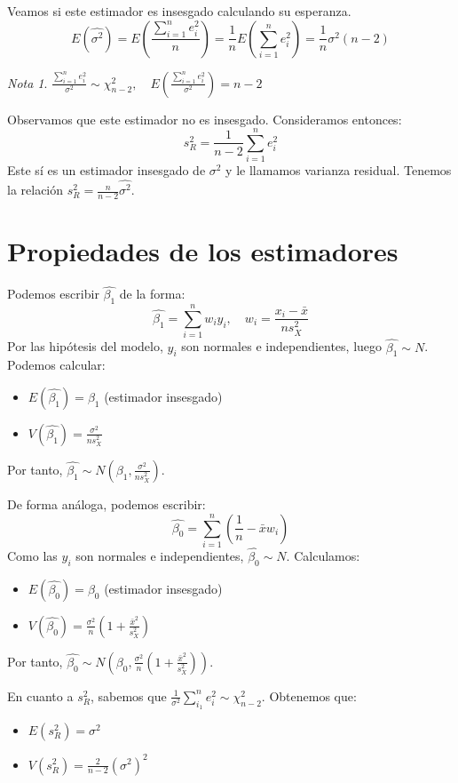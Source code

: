 \documentclass{report}
\theoremstyle{remark}
\theoremstyle{remark}
\newtheorem*{note}{Nota}
\theoremstyle{remark}
\theoremstyle{definition}
\theoremstyle{definition}
\theoremstyle{definition}
\begin{document}
Veamos si este estimador es insesgado calculando su esperanza.
$$E(\hat{\sigma^2}) = E(\frac{\sum_{i=1}^n e_i^2}{n}) = \frac{1}{n}E(\sum_{i=1}^n e_i^2) = \frac{1}{n}\sigma^2(n-2)$$

\begin{note}
    $\frac{\sum_{i=1}^n e_i^2}{\sigma^2} \sim \chi^2_{n-2}, \quad E(\frac{\sum_{i=1}^n e_i^2}{\sigma^2}) = n-2$
\end{note}

Observamos que este estimador no es insesgado. Consideramos entonces:
$$s_R^2 = \frac{1}{n-2}\sum_{i=1}^n e_i^2$$
Este sí es un estimador insesgado de $\sigma^2$ y le llamamos varianza residual.
Tenemos la relación $s_R^2 = \frac{n}{n-2} \hat{\sigma^2}$.

\section{Propiedades de los estimadores}
Podemos escribir $\hat{\beta_1}$ de la forma:
$$\hat{\beta_1} = \sum_{i=1}^n w_iy_i, \quad w_i = \frac{x_i - \bar{x}}{ns_X^2}$$
Por las hipótesis del modelo, $y_i$ son normales e independientes, luego $\hat{\beta_1} \sim N$.
Podemos calcular:

\begin{itemize}
    \item $E(\hat{\beta_1}) = \beta_1$ (estimador insesgado)
    \item $V(\hat{\beta_1}) = \frac{\sigma^2}{ns_X^2}$
\end{itemize}
Por tanto, $\hat{\beta_1} \sim N(\beta_1, \frac{\sigma^2}{ns_X^2})$.

De forma análoga, podemos escribir:
$$\hat{\beta_0} = \sum_{i=1}^n (\frac{1}{n} - \bar{x}w_i)$$
Como las $y_i$ son normales e independientes, $\hat{\beta_0} \sim N$.
Calculamos:

\begin{itemize}
    \item $E(\hat{\beta_0}) = \beta_0$ (estimador insesgado)
    \item $V(\hat{\beta_0}) = \frac{\sigma^2}{n} (1 + \frac{\bar{x}^2}{s_X^2})$
\end{itemize}
Por tanto, $\hat{\beta_0} \sim N(\beta_0, \frac{\sigma^2}{n} (1 + \frac{\bar{x}^2}{s_X^2}))$.

En cuanto a $s_R^2$, sabemos que $\frac{1}{\sigma^2} \sum_{i_1}^n e_i^2 \sim \chi^2_{n-2}$.
Obtenemos que:
\begin{itemize}
    \item $E(s_R^2) = \sigma^2$
    \item $V(s_R^2) = \frac{2}{n-2} (\sigma^2)^2$
\end{itemize}
\end{document}
